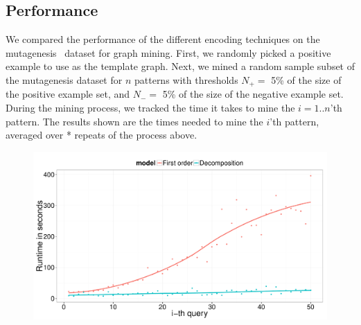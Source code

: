 %
%
%
%
%
%
%
%

\subsection{Performance}
\label{sec:performance}
We compared the performance of the different encoding techniques on the mutagenesis~\citep{?} dataset for graph mining.
First, we randomly picked a positive example to use as the template graph.
Next, we mined a random sample subset of the mutagenesis dataset for $n$ patterns with thresholds $N_{+} = $ 5\% of the size of the positive example set, and $N_{-} =$ 5\% of the size of the negative example set.
During the mining process, we tracked the time it takes to mine the $i=1..n$'th pattern.
The results shown are the times needed to mine the $i$'th pattern, averaged over * repeats of the process above.
\begin{figure}
\includegraphics[width=\linewidth]{extra/figure_comparison_yoshida.pdf}
\end{figure}
